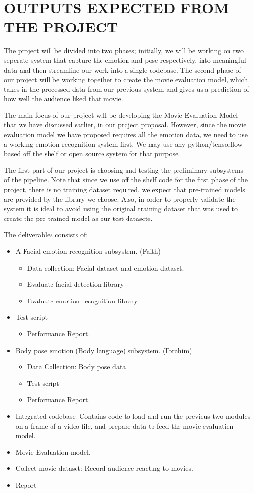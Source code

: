 \documentclass[12pt,a4paper,man]{report}
\begin{document}
\section{OUTPUTS EXPECTED FROM THE PROJECT}
\label{sec:orgb64c798}

The project will be divided into two phases; initially, we will be working on two seperate system that capture the emotion and pose respectively, into meaningful data and then streamline our work into a single codebase. The second phase of our project will be working together to create the movie evaluation model, which takes in the processed data from our previous system and gives us a prediction of how well the audience liked that movie. 

The main focus of our project will be developing the Movie Evaluation Model that we have discussed earlier, in our project proposal. However, since the movie evaluation model we have proposed requires all the emotion data, we need to use a working emotion recognition system first. We may use any python/tensorflow based off the shelf or open source system for that purpose. 

The first part of our project is choosing and testing the preliminary subsystems of the pipeline. Note that since we use off the shelf code for the first phase of the project, there is no training dataset required, we expect that pre-trained models are provided by the library we choose. Also, in order to properly validate the system it is ideal to avoid using the original training dataset that was used to create the pre-trained model as our test datasets. 

The deliverables consists of:
\begin{itemize}
\item A Facial emotion recognition subsystem. (Faith) 
\begin{itemize}
\item Data collection: Facial dataset and emotion dataset.
\item Evaluate facial detection library
\item Evaluate emotion recognition library
\end{itemize}
\item Test script
\begin{itemize}
\item Performance Report.
\end{itemize}
\item Body pose emotion (Body language) subsystem. (Ibrahim)
\begin{itemize}
\item Data Collection: Body pose data
\item Test script
\item Performance Report.
\end{itemize}
\item Integrated codebase: Contains code to load and run the previous two modules on a frame of a video file, and prepare data to feed the movie evaluation model.
\item Movie Evaluation model.
\item Collect movie dataset: Record audience reacting to movies.
\item Report
\end{itemize}
\end{document}
